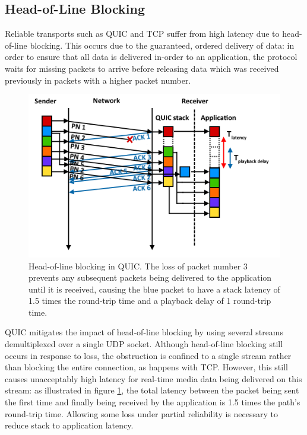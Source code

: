 \documentclass{mpaper}
\begin{document}
\subsection{Head-of-Line Blocking}

Reliable transports such as QUIC and TCP suffer from high latency due to head-of-line blocking. This occurs due to the guaranteed, ordered delivery of data: in order to ensure that all data is delivered in-order to an application, the protocol waits for missing packets to arrive before releasing data which was received previously in packets with a higher packet number.

\begin{figure}[h]
\includegraphics[scale=0.5]{images/head-of-line-blocking}
\centering
\caption{Head-of-line blocking in QUIC. The loss of packet number 3 prevents any subsequent packets being delivered to the application until it is received, causing the blue packet to have a stack latency of 1.5 times the round-trip time and a playback delay of 1 round-trip time.}
\label{hol}
\end{figure}

QUIC mitigates the impact of head-of-line blocking by using several streams demultiplexed 
over a single UDP socket. Although head-of-line blocking still occurs in response to loss, the 
obstruction is confined to a single stream rather than blocking the entire connection, as happens with TCP. However, this still causes unacceptably high latency for real-time media data being delivered on this stream: as illustrated in figure \ref{hol}, the total latency between the packet being sent the first time and finally being received by the application is 1.5 times the path's round-trip time. Allowing some loss under partial reliability is necessary to reduce stack to application latency.
\end{document}
